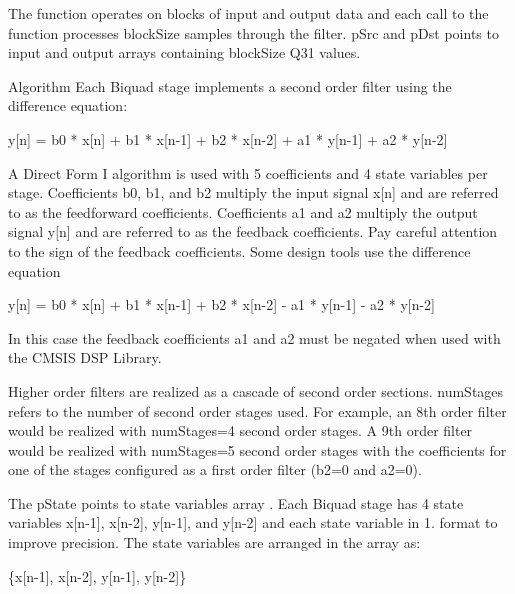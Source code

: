 The function operates on blocks of input and output data and each call to the function processes {\ttfamily block\-Size} samples through the filter. {\ttfamily p\-Src} and {\ttfamily p\-Dst} points to input and output arrays containing {\ttfamily block\-Size} Q31 values.

\begin{DoxyParagraph}{Algorithm }
Each Biquad stage implements a second order filter using the difference equation\-: 
\begin{DoxyPre}    
    y[n] = b0 * x[n] + b1 * x[n-1] + b2 * x[n-2] + a1 * y[n-1] + a2 * y[n-2]    
\end{DoxyPre}
 A Direct Form I algorithm is used with 5 coefficients and 4 state variables per stage.  Coefficients {\ttfamily b0, b1, and b2 } multiply the input signal {\ttfamily x\mbox{[}n\mbox{]}} and are referred to as the feedforward coefficients. Coefficients {\ttfamily a1} and {\ttfamily a2} multiply the output signal {\ttfamily y\mbox{[}n\mbox{]}} and are referred to as the feedback coefficients. Pay careful attention to the sign of the feedback coefficients. Some design tools use the difference equation 
\begin{DoxyPre}    
    y[n] = b0 * x[n] + b1 * x[n-1] + b2 * x[n-2] - a1 * y[n-1] - a2 * y[n-2]    
\end{DoxyPre}
 In this case the feedback coefficients {\ttfamily a1} and {\ttfamily a2} must be negated when used with the C\-M\-S\-I\-S D\-S\-P Library.
\end{DoxyParagraph}
\begin{DoxyParagraph}{}
Higher order filters are realized as a cascade of second order sections. {\ttfamily num\-Stages} refers to the number of second order stages used. For example, an 8th order filter would be realized with {\ttfamily num\-Stages=4} second order stages.  A 9th order filter would be realized with {\ttfamily num\-Stages=5} second order stages with the coefficients for one of the stages configured as a first order filter ({\ttfamily b2=0} and {\ttfamily a2=0}).
\end{DoxyParagraph}
\begin{DoxyParagraph}{}
The {\ttfamily p\-State} points to state variables array . Each Biquad stage has 4 state variables {\ttfamily x\mbox{[}n-\/1\mbox{]}, x\mbox{[}n-\/2\mbox{]}, y\mbox{[}n-\/1\mbox{]},} and {\ttfamily y\mbox{[}n-\/2\mbox{]}} and each state variable in 1. format to improve precision. The state variables are arranged in the array as\-: 
\begin{DoxyPre}    
    \{x[n-1], x[n-2], y[n-1], y[n-2]\}    
\end{DoxyPre}

\end{DoxyParagraph}
